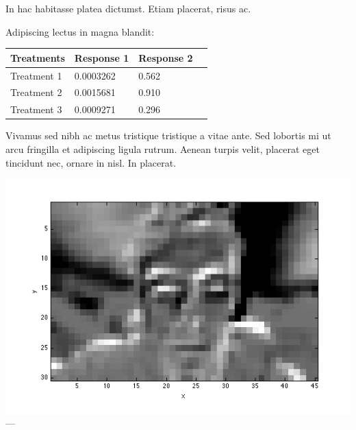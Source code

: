 \documentclass[a0,landscape]{a0poster}
\begin{document}
\begin{multicols}{4}
In hac habitasse platea dictumst. Etiam placerat, risus ac.

Adipiscing lectus in magna blandit:

\begin{center}\vspace{1cm}
\begin{tabular}{l l l l}
\toprule
\textbf{Treatments} & \textbf{Response 1} & \textbf{Response 2} \\
\midrule
Treatment 1 & 0.0003262 & 0.562 \\
Treatment 2 & 0.0015681 & 0.910 \\
Treatment 3 & 0.0009271 & 0.296 \\
\bottomrule
\end{tabular}
\end{center}\vspace{1cm}

Vivamus sed nibh ac metus tristique tristique a vitae ante. Sed lobortis mi ut arcu fringilla et adipiscing ligula rutrum. Aenean turpis velit, placerat eget tincidunt nec, ornare in nisl. In placerat.

\begin{center}\vspace{1cm}
\includegraphics[width=0.8\linewidth]{images/red_trough.png}
---
\end{center}\vspace{1cm}


\color{SaddleBrown} %


\end{multicols}
\end{document}
